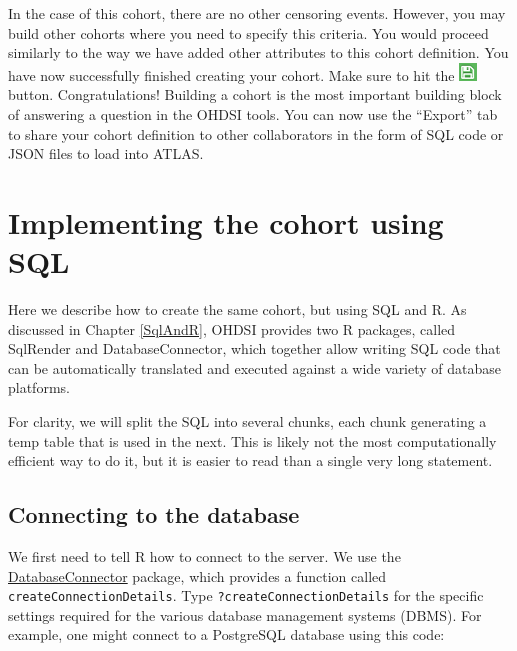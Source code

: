 \documentclass[11pt]{book}
\theoremstyle{definition}
\theoremstyle{definition}
\theoremstyle{definition}
\theoremstyle{remark}
\begin{document}
In the case of this cohort, there are no other censoring events. However, you may build other cohorts where you need to specify this criteria. You would proceed similarly to the way we have added other attributes to this cohort definition. You have now successfully finished creating your cohort. Make sure to hit the \includegraphics{images/Cohorts/save.png} button. Congratulations! Building a cohort is the most important building block of answering a question in the OHDSI tools. You can now use the ``Export'' tab to share your cohort definition to other collaborators in the form of SQL code or JSON files to load into ATLAS.

\hypertarget{implementing-the-cohort-using-sql}{%
\section{Implementing the cohort using SQL}\label{implementing-the-cohort-using-sql}}

Here we describe how to create the same cohort, but using SQL and R. As discussed in Chapter \ref{SqlAndR}, OHDSI provides two R packages, called SqlRender and DatabaseConnector, which together allow writing SQL code that can be automatically translated and executed against a wide variety of database platforms.

For clarity, we will split the SQL into several chunks, each chunk generating a temp table that is used in the next. This is likely not the most computationally efficient way to do it, but it is easier to read than a single very long statement.

\hypertarget{connecting-to-the-database}{%
\subsection{Connecting to the database}\label{connecting-to-the-database}}

We first need to tell R how to connect to the server. We use the \href{https://ohdsi.github.io/DatabaseConnector/}{DatabaseConnector} package, which provides a function called \texttt{createConnectionDetails}. Type \texttt{?createConnectionDetails} for the specific settings required for the various database management systems (DBMS). For example, one might connect to a PostgreSQL database using this code:
\end{document}
